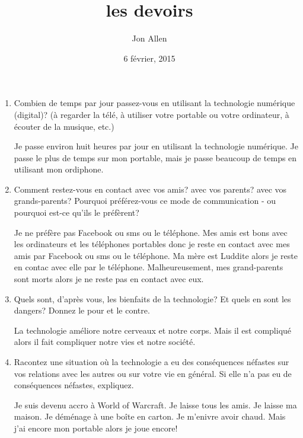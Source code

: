 \documentclass[letterpaper]{article}
\begin{document}
\title{les devoirs}
\date{6 février, 2015}
\author{Jon Allen}
\maketitle
\doublespacing
\begin{enumerate}
\item
Combien de temps par jour passez-vous en utilisant la technologie numérique (digital)?  (à regarder la télé, à utiliser votre portable ou votre ordinateur, à écouter de la musique, etc.)

Je passe environ huit heures par jour en utilisant la technologie numérique. Je passe le plus de temps sur mon portable, mais je passe beaucoup de temps en utilisant mon ordiphone.
\item
Comment restez-vous en contact avec vos amis?  avec vos parents?  avec vos grands-parents?   Pourquoi préférez-vous ce mode de communication  - ou pourquoi est-ce qu'ils le préfèrent?


Je ne préfère pas Facebook ou sms ou le téléphone. Mes amis est bons avec les ordinateurs et les téléphones portables donc je reste en contact avec mes amis par Facebook ou sms ou le téléphone. Ma mère est Luddite alors je reste en contac avec elle par le téléphone.
Malheureusement, mes grand-parents sont morts alors je ne reste pas en contact avec eux.
\item
Quels sont, d'après vous, les bienfaits de la technologie?  Et quels en sont les dangers?  Donnez le pour et le contre.

La technologie améliore notre cerveaux et notre corps. Mais il est compliqué alors il fait compliquer notre vies et notre société.
\item
Racontez une situation où la technologie a eu des conséquences néfastes sur vos relations avec les autres ou sur votre vie en général.  Si elle n'a pas eu de conséquences néfastes, expliquez.

Je suis devenu accro à World of Warcraft. Je laisse tous les amis. Je laisse ma maison. Je déménage à une boîte en carton. Je m'enivre avoir chaud. Mais j'ai encore mon portable alors je joue encore!
\end{enumerate}
\end{document}

